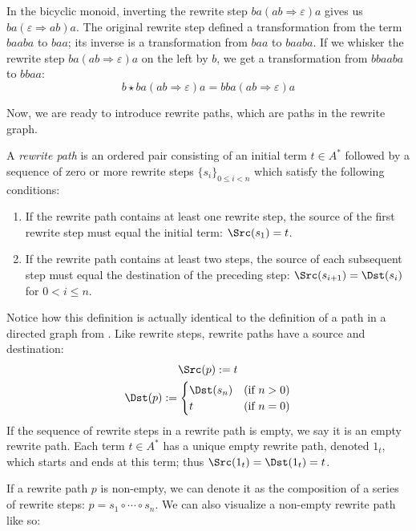 \documentclass[../generics]{subfiles}
\begin{document}
\begin{example}
In the bicyclic monoid, inverting the rewrite step $ba(ab\Rightarrow\varepsilon)a$ gives us $ba(\varepsilon\Rightarrow ab)a$. The original rewrite step defined a transformation from the term $baaba$ to $baa$; its inverse is a transformation from $baa$ to $baaba$. If we whisker the rewrite step $ba(ab\Rightarrow\varepsilon)a$ on the left by $b$, we get a transformation from $bbaaba$ to $bbaa$:
\[b\star ba(ab\Rightarrow\varepsilon)a=bba(ab\Rightarrow\varepsilon)a\]

Now, we are ready to introduce rewrite paths, which are paths in the rewrite graph. 
\end{example}
\begin{definition}
%
A \emph{rewrite path} is an ordered pair consisting of an initial term $t\in A^*$ followed by a sequence of zero or more rewrite steps $\{s_i\}_{0\leq i<n}$ which satisfy the following conditions:
\begin{enumerate}
\item If the rewrite path contains at least one rewrite step, the source of the first rewrite step must equal the initial term: $\Src(s_1)=t$.
\item If the rewrite path contains at least two steps, the source of each subsequent step must equal the destination of the preceding step: $\Src(s_{i+1})=\Dst(s_i)$ for $0<i\leq n$.
\end{enumerate}
Notice how this definition is actually identical to the definition of a path in a directed graph from . Like rewrite steps, rewrite paths have a source and destination:
\begin{gather*}
\Src(p):=t\\
\Dst(p):=\begin{cases}
\Dst(s_n)&\text{(if $n>0$)}\\
t&\text{(if $n=0$)}
\end{cases}
\end{gather*}
If the sequence of rewrite steps in a rewrite path is empty, we say it is an empty rewrite path. Each term $t\in A^*$ has a unique empty rewrite path, denoted $1_t$, which starts and ends at this term; thus $\Src(1_t)=\Dst(1_t)=t$.

If a rewrite path $p$ is non-empty, we can denote it as the composition of a series of rewrite steps: $p=s_1\circ\cdots\circ s_n$. We can also visualize a non-empty rewrite path like so:
\begin{quote}
\end{quote}

\end{definition}
\end{document}
